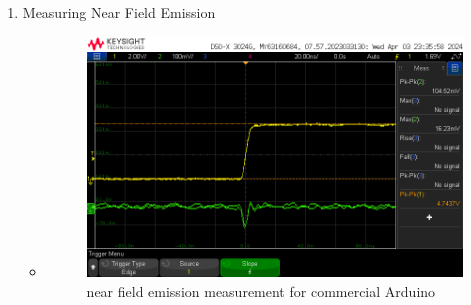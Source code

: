 \documentclass[a4paper,11pt]{article}%
\begin{document}
\begin{enumerate}
	\item Measuring Near Field Emission
	      \begin{itemize}
		      \item
		            \begin{figure}[H]
			            \centering
			            \includegraphics[scale=0.6]{figures/commercial_ard/nfe_rise.png}
			            \caption{near field emission measurement for commercial Arduino}
		            \end{figure}


\end{itemize}
\end{enumerate}
\end{document}
